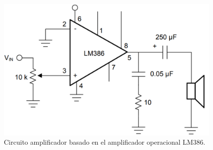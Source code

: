 \begin{figure}[h]
	\centering
	\includegraphics[scale=.35]{./Figures/amplificadorLM386.pdf}
	\caption{Circuito amplificador basado en el amplificador operacional LM386.}
	\label{fig:amplificadorLM386}
\end{figure}
